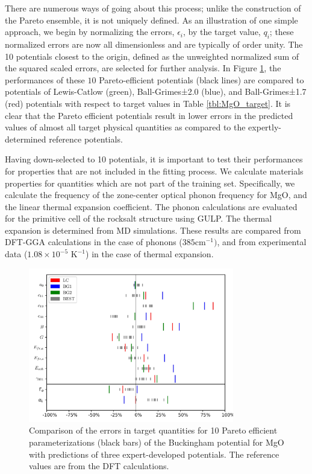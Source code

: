 	There are numerous ways of going about this process; unlike the construction of the Pareto ensemble, it is not uniquely defined.  As an illustration of one simple approach, we begin by normalizing the errors, $\epsilon_i$, by the target value, $q_i$; these normalized errors are now all dimensionless and are typically of order unity.  The 10 potentials closest to the origin, defined as the unweighted normalized sum of the squared scaled errors, are selected for further analysis.  In Figure \ref{fig:MgO_qoi_rugplots}, the performances of these $10$ Pareto-efficient potentials (black lines) are compared to potentials of Lewis-Catlow (green), Ball-Grimes±2.0 (blue), and Ball-Grimes±1.7 (red) potentials with respect to target values in Table \ref{tbl:MgO_target}. It is clear that the Pareto efficient potentials result in lower errors in the predicted values of almost all target physical quantities as compared to the expertly-determined reference potentials.

Having down-selected to 10 potentials, it is important to test their performances for properties that are not included in the fitting process. We calculate materials properties for quantities which are not part of the training set.  Specifically, we calculate the frequency of the zone-center optical phonon frequency for MgO, and the linear thermal expansion coefficient.  The phonon calculations are evaluated for the primitive cell of the rocksalt structure using GULP\cite{gale2003_gulp}.  The thermal expansion is determined from MD simulations. These results are compared from DFT-GGA calculations in the case of phonons ($385 \text{cm}^{-1})$, and from experimental data ($1.08\times10^{-5}$ $\text{K}^{-1}$) \cite{ho1998_thermal_expansion} in the case of thermal expansion.

\begin{figure}[ht]
	\centering
  \includegraphics[width=0.8\textwidth]{chapter7/MgO_qoi_rugplots}
  \caption{Comparison of the errors in target quantities for 10 Pareto efficient parameterizations (black bars) of the Buckingham potential for MgO with predictions of three expert-developed potentials. The reference values are from the DFT calculations.}
  \label{fig:MgO_qoi_rugplots}
\end{figure}


